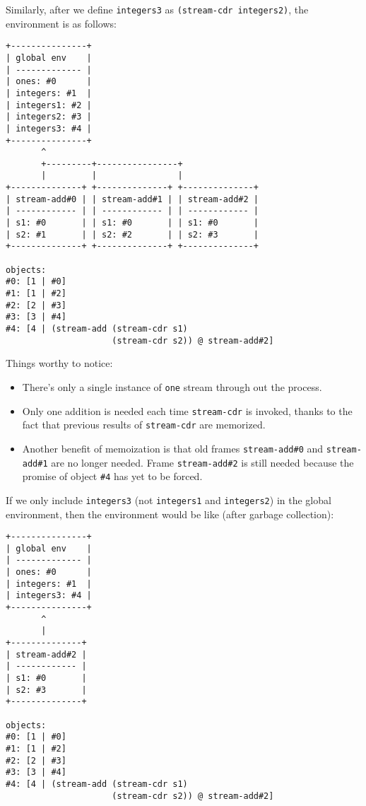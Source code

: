 \documentclass[../main.tex]{subfiles}
\begin{document}
Similarly, after we define \lstinline{integers3} as \lstinline{(stream-cdr integers2)}, the environment is as follows:

\begin{lstlisting}
+---------------+
| global env    |
| ------------- |
| ones: #0      |
| integers: #1  |
| integers1: #2 |
| integers2: #3 |
| integers3: #4 |
+---------------+
       ^
       +---------+----------------+
       |         |                |
+--------------+ +--------------+ +--------------+
| stream-add#0 | | stream-add#1 | | stream-add#2 |
| ------------ | | ------------ | | ------------ |
| s1: #0       | | s1: #0       | | s1: #0       |
| s2: #1       | | s2: #2       | | s2: #3       |
+--------------+ +--------------+ +--------------+

objects:
#0: [1 | #0]
#1: [1 | #2]
#2: [2 | #3]
#3: [3 | #4]
#4: [4 | (stream-add (stream-cdr s1)
                     (stream-cdr s2)) @ stream-add#2]
\end{lstlisting}

Things worthy to notice:

\begin{itemize}
\item There's only a single instance of \lstinline{one} stream through out the process.
\item Only one addition is needed each time \lstinline{stream-cdr} is invoked, thanks to the fact that previous results of \lstinline{stream-cdr} are memorized.
\item Another benefit of memoization is that old frames \lstinline{stream-add#0} and \lstinline{stream-add#1} are no longer needed. Frame \lstinline{stream-add#2} is still needed because the promise of object \lstinline{#4} has yet to be forced.
\end{itemize}

If we only include \lstinline{integers3} (not \lstinline{integers1} and \lstinline{integers2}) in the global environment, then the environment would be like (after garbage collection):

\begin{lstlisting}
+---------------+
| global env    |
| ------------- |
| ones: #0      |
| integers: #1  |
| integers3: #4 |
+---------------+
       ^
       |
+--------------+
| stream-add#2 |
| ------------ |
| s1: #0       |
| s2: #3       |
+--------------+

objects:
#0: [1 | #0]
#1: [1 | #2]
#2: [2 | #3]
#3: [3 | #4]
#4: [4 | (stream-add (stream-cdr s1)
                     (stream-cdr s2)) @ stream-add#2]
\end{lstlisting}
\end{document}
